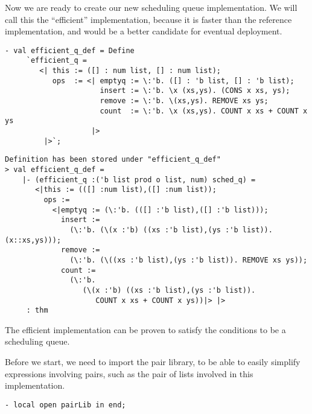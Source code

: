 Now we are ready to create our new scheduling queue implementation.
We will call this the ``efficient'' implementation, because it is
faster than the reference implementation, and would be a better
candidate for eventual deployment.
\begin{session}
\begin{verbatim}
- val efficient_q_def = Define
     `efficient_q =
        <| this := ([] : num list, [] : num list);
           ops  := <| emptyq := \:'b. ([] : 'b list, [] : 'b list);
                      insert := \:'b. \x (xs,ys). (CONS x xs, ys);
                      remove := \:'b. \(xs,ys). REMOVE xs ys;
                      count  := \:'b. \x (xs,ys). COUNT x xs + COUNT x ys
                    |>
         |>`;
\end{verbatim}
\end{session}

\begin{session}
\begin{verbatim}
Definition has been stored under "efficient_q_def"
> val efficient_q_def =
    |- (efficient_q :('b list prod o list, num) sched_q) =
       <|this := (([] :num list),([] :num list));
         ops :=
           <|emptyq := (\:'b. (([] :'b list),([] :'b list)));
             insert :=
               (\:'b. (\(x :'b) ((xs :'b list),(ys :'b list)). (x::xs,ys)));
             remove :=
               (\:'b. (\((xs :'b list),(ys :'b list)). REMOVE xs ys));
             count :=
               (\:'b.
                  (\(x :'b) ((xs :'b list),(ys :'b list)).
                     COUNT x xs + COUNT x ys))|> |>
     : thm
\end{verbatim}
\end{session}

The efficient implementation can be proven to satisfy the conditions 
to be a scheduling queue.

Before we start, we need to import the pair library, to be able to 
easily simplify expressions involving pairs, such as the pair of lists
involved in this implementation.
\begin{session}
\begin{verbatim}
- local open pairLib in end;
\end{verbatim}
\end{session}

